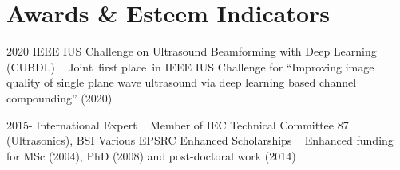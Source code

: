 \documentclass[english]{cv-style}
\begin{document}
\section{Awards \& Esteem Indicators}
\vspace{-0.2cm}
\begin{entrylist}
\entry
{2020}
{IEEE IUS Challenge on Ultrasound Beamforming with Deep Learning (CUBDL)}
{~}
{Joint~first place~in IEEE IUS Challenge for \enquote{Improving image quality of single plane wave ultrasound via deep learning based channel compounding} (2020) }

\entry
{2015-}
{International Expert}
{~}
{Member of IEC Technical Committee 87 (Ultrasonics), BSI}
%
%
%
\entry
{Various}
{EPSRC Enhanced Scholarships}
{~}
{Enhanced funding for MSc (2004), PhD (2008) and post-doctoral work (2014)}
\end{entrylist}


%

%
\end{document}
